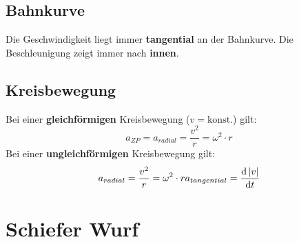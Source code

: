 \begin{footnotesize}
\end{footnotesize}
\newline


\subsection{Bahnkurve}

Die Geschwindigkeit liegt immer \textbf{tangential} an der Bahnkurve. \newline
\newline
Die Beschleunigung zeigt immer nach \textbf{innen}.

\subsection{Kreisbewegung}
Bei einer \textbf{gleichf\"ormigen} Kreisbewegung ($v=\mathrm{konst.}$) gilt:
\[
	a_{ZP}=a_{radial}=\frac{v^2}{r}=\omega^2 \cdot r
\]
\newline
\newline
Bei einer \textbf{ungleichf\"ormigen} Kreisbewegung gilt:
\[
	a_{radial}=\frac{v^2}{r}=\omega^2 \cdot r \\
	a_{tangential}=\frac{\mathrm{d}\left|v\right|}{\mathrm{d}t}
\]

\section{Schiefer Wurf}

